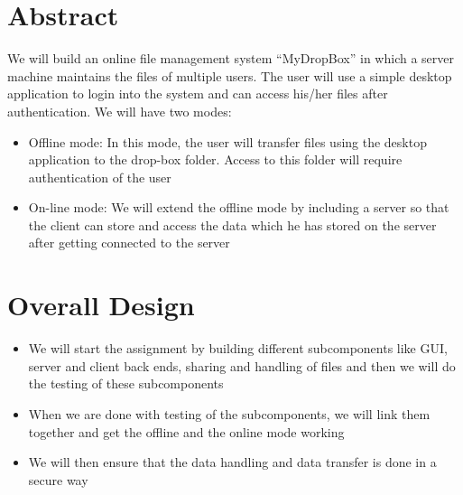 \documentclass{article}
\begin{document}
	\title{}

	\author{Aniket Khandelwal(2013CS10209),
		Anupam Khandelwal(2013CS10212),\\
		Ronak Khandelwal(2013CS50295)
	}

	\date{\today}
	\maketitle

	\tableofcontents
	\pagebreak

	\section{Abstract}
		We will build an online file management system ``MyDropBox''  in which a server machine maintains the files of multiple users. The user will use  a simple desktop application to login into the system and can access his/her files after authentication. We will have two modes:
		\begin{itemize}
			\item Offline mode: In this mode, the user will transfer files using the desktop application to the drop-box folder. Access to this folder will require authentication of the user
			\item On-line mode: We will extend the offline mode by including a server so that the client can store and access the data which he has stored on the server after getting connected to the server
		\end{itemize}
	\section{Overall Design}
		\begin{itemize}
			\item We will start the assignment by building different subcomponents like GUI, server and client back ends, sharing and handling of files and then we will do the testing of these subcomponents
			\item When we are done with testing of the subcomponents, we will link them together and get the offline and the online mode working
			\item We will then ensure that the data handling and data transfer is done in a secure way
		\end{itemize}
\end{document}
